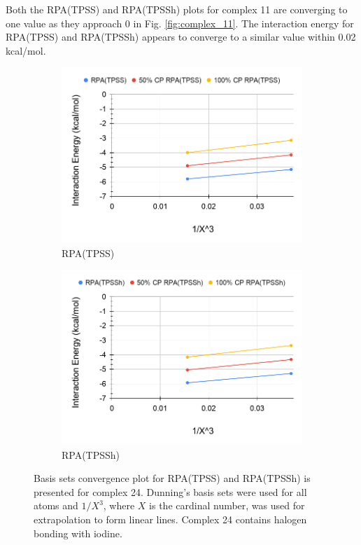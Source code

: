 \documentclass[11pt]{article}
\begin{document}
Both the RPA(TPSS) and RPA(TPSSh) plots for complex 11 are converging
to one value as they approach 0 in Fig. \ref{fig:complex_11}. The
interaction energy for RPA(TPSS) and RPA(TPSSh) appears to converge to
a similar value within 0.02 kcal/mol.

\begin{figure}[hbpt]
  \centering
  \begin{subfigure}{.5\textwidth}
    \centering
    \includegraphics[scale=0.3]{tpss-24.png}
    \caption{RPA(TPSS)}
    \label{fig:tpss_24}
  \end{subfigure}%
  \begin{subfigure}{.5\textwidth}
    \centering
    \includegraphics[scale=0.3]{tpssh-24.png}
    \caption{RPA(TPSSh)}
    \label{fig:tpssh_24}
  \end{subfigure}
  \caption{Basis sets convergence plot for RPA(TPSS) and RPA(TPSSh) is
    presented for complex 24. Dunning's basis sets were used for all
    atoms and $1/X^3$, where $X$ is the cardinal number, was used for
    extrapolation to form linear lines. Complex 24 contains halogen 
    bonding with iodine.}
  \label{fig:complex_24}
\end{figure}
\end{document}
